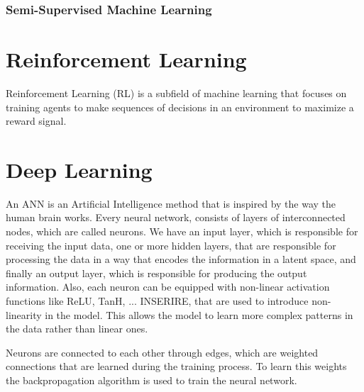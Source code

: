 \subsubsection{Semi-Supervised Machine Learning}
\label{sec:semisupervised_ml}


\section{Reinforcement Learning}
\label{sec:rl}
Reinforcement Learning (RL) is a subfield of machine learning that focuses on training agents to make sequences of decisions in an environment to maximize a reward signal.











\section{Deep Learning}
\label{sec:dl}

An ANN is an Artificial Intelligence method that is inspired by the way the human brain works.
Every neural network, consists of layers of interconnected nodes, which are called neurons.
We have an input layer, which is responsible for receiving the input data, one or more hidden layers, that are responsible for processing the data in a way that encodes the information in a latent space, and finally an output layer, which is responsible for producing the output information.
Also, each neuron can be equipped with non-linear activation functions like ReLU, TanH, ... INSERIRE, that are used to introduce non-linearity in the model.
This allows the model to learn more complex patterns in the data rather than linear ones.

Neurons are connected to each other through edges, which are weighted connections that are learned during the training process.
To learn this weights the backpropagation algorithm is used to train the neural network.




